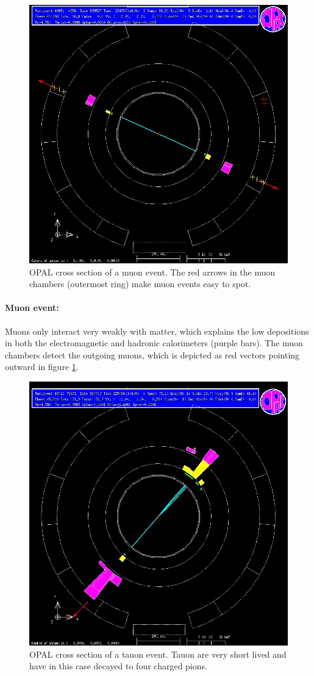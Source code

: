 \begin{figure}[H]
\centering
\includegraphics[width=0.75\linewidth]{graphics/muonopal}
\caption[OPAL cross section muon event]{OPAL cross section of a muon event. The red arrows in the muon chambers (outermost ring) make muon events easy to spot. \cite{cern}}
\label{fig:muonopal}
\end{figure}
\paragraph{Muon event:} Muons only interact very weakly with matter, which explains the low depositions in both the electromagnetic and hadronic calorimeters (purple bars). The muon chambers detect the outgoing muons, which is depicted as red vectors pointing outward in figure \ref{fig:muonopal}.
\newpage
\begin{figure}[H]
\centering
\includegraphics[width=0.75\linewidth]{graphics/tauonopalhadronisch}
\caption[OPAL cross section tauon event]{OPAL cross section of a tauon event. Tauon are very short lived and have in this case decayed to four charged pions. \cite{cern}}
\label{fig:tauonopal}
\end{figure}
